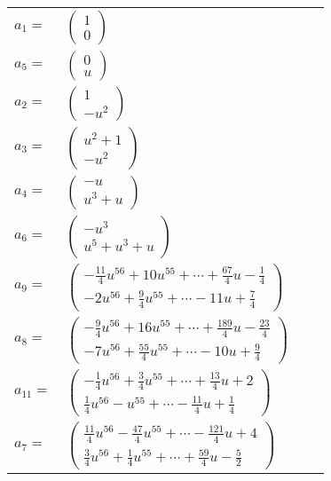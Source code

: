 \documentclass[1p]{elsarticle_modified}
\theoremstyle{definition}
\begin{document}
\begin{tabular}{m{7pt} m{180pt} m{7pt} m{180pt} }
\flushright $a_{1}=$&$\begin{pmatrix}1\\0\end{pmatrix}$ \\
\flushright $a_{5}=$&$\begin{pmatrix}0\\u\end{pmatrix}$ \\
\flushright $a_{2}=$&$\begin{pmatrix}1\\- u^2\end{pmatrix}$ \\
\flushright $a_{3}=$&$\begin{pmatrix}u^2+1\\- u^2\end{pmatrix}$ \\
\flushright $a_{4}=$&$\begin{pmatrix}- u\\u^3+u\end{pmatrix}$ \\
\flushright $a_{6}=$&$\begin{pmatrix}- u^3\\u^5+u^3+u\end{pmatrix}$ \\
\flushright $a_{9}=$&$\begin{pmatrix}-\frac{11}{4} u^{56}+10 u^{55}+\cdots+\frac{67}{4} u-\frac{1}{4}\\-2 u^{56}+\frac{9}{4} u^{55}+\cdots-11 u+\frac{7}{4}\end{pmatrix}$ \\
\flushright $a_{8}=$&$\begin{pmatrix}-\frac{9}{4} u^{56}+16 u^{55}+\cdots+\frac{189}{4} u-\frac{23}{4}\\-7 u^{56}+\frac{55}{4} u^{55}+\cdots-10 u+\frac{9}{4}\end{pmatrix}$ \\
\flushright $a_{11}=$&$\begin{pmatrix}-\frac{1}{4} u^{56}+\frac{3}{4} u^{55}+\cdots+\frac{13}{4} u+2\\\frac{1}{4} u^{56}- u^{55}+\cdots-\frac{11}{4} u+\frac{1}{4}\end{pmatrix}$ \\
\flushright $a_{7}=$&$\begin{pmatrix}\frac{11}{4} u^{56}-\frac{47}{4} u^{55}+\cdots-\frac{121}{4} u+4\\\frac{3}{4} u^{56}+\frac{1}{4} u^{55}+\cdots+\frac{59}{4} u-\frac{5}{2}\end{pmatrix}$ \\

\end{tabular}
\end{document}
